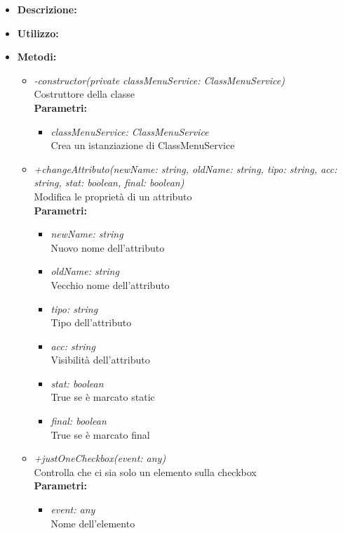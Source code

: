 \begin{itemize}
	\item \textbf{Descrizione:}\\
	
	\item \textbf{Utilizzo:}\\
	
	\item \textbf{Metodi:}
		\begin{itemize}
			\item \emph{-constructor(private classMenuService: ClassMenuService)}\\
    		Costruttore della classe\\
    		\textbf{Parametri:}
    		\begin{itemize}
    			\item \emph{classMenuService: ClassMenuService}\\
    			Crea un istanziazione di ClassMenuService
    		\end{itemize}
    		\item \emph{+changeAttributo(newName: string, oldName: string, tipo: string, acc: string, stat: boolean, final: boolean)}\\
    		Modifica le proprietà di un attributo\\
    		\textbf{Parametri:}
    		\begin{itemize}
    			\item \emph{newName: string}\\
    			Nuovo nome dell'attributo
    			\item \emph{oldName: string}\\
    			Vecchio nome dell'attributo
    			\item \emph{tipo: string}\\
    			Tipo dell'attributo
    			\item \emph{acc: string}\\
    			Visibilità dell'attributo
    			\item \emph{stat: boolean}\\
    			True se è marcato static
    			\item \emph{final: boolean}\\
    			True se è marcato final
    		\end{itemize}
    		\item \emph{+justOneCheckbox(event: any)}\\
    		Controlla che ci sia solo un elemento sulla checkbox\\
    		\textbf{Parametri:}
    		\begin{itemize}
    			\item \emph{event: any}\\
    			Nome dell'elemento
    		\end{itemize}
		\end{itemize}
\end{itemize}
